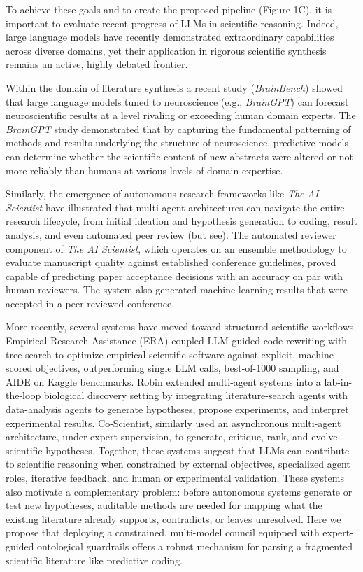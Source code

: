 \documentclass[12pt]{article}
\begin{document}
To achieve these goals and to create the proposed pipeline (Figure 1C), it is important to evaluate recent progress of LLMs in scientific reasoning. Indeed, large language models have recently demonstrated extraordinary capabilities across diverse domains, yet their application in rigorous scientific synthesis remains an active, highly debated frontier\cite{ref5,ref44,ref45,ref46}.

Within the domain of literature synthesis a recent study (\emph{BrainBench}) showed that large language models tuned to neuroscience (e.g., \emph{BrainGPT}) can forecast neuroscientific results at a level rivaling or exceeding human domain experts\cite{ref5}. The \emph{BrainGPT} study demonstrated that by capturing the fundamental patterning of methods and results underlying the structure of neuroscience, predictive models can determine whether the scientific content of new abstracts were altered or not more reliably than humans at various levels of domain expertise\cite{ref5}.

Similarly, the emergence of autonomous research frameworks like \emph{The AI Scientist}\cite{ref45} have illustrated that multi-agent architectures can navigate the entire research lifecycle, from initial ideation and hypothesis generation to coding, result analysis, and even automated peer review (but see\cite{ref47}). The automated reviewer component of \emph{The AI Scientist}, which operates on an ensemble methodology to evaluate manuscript quality against established conference guidelines, proved capable of predicting paper acceptance decisions with an accuracy on par with human reviewers. The system also generated machine learning results that were accepted in a peer-reviewed conference\cite{ref45}.

More recently, several systems have moved toward structured scientific workflows. Empirical Research Assistance (ERA)\cite{ref48} coupled LLM-guided code rewriting with tree search to optimize empirical scientific software against explicit, machine-scored objectives, outperforming single LLM calls, best-of-1000 sampling, and AIDE on Kaggle benchmarks. Robin\cite{ref86} extended multi-agent systems into a lab-in-the-loop biological discovery setting by integrating literature-search agents with data-analysis agents to generate hypotheses, propose experiments, and interpret experimental results. Co-Scientist\cite{ref87}, similarly used an asynchronous multi-agent architecture, under expert supervision, to generate, critique, rank, and evolve scientific hypotheses. Together, these systems suggest that LLMs can contribute to scientific reasoning when constrained by external objectives, specialized agent roles, iterative feedback, and human or experimental validation. These systems also motivate a complementary problem: before autonomous systems generate or test new hypotheses, auditable methods are needed for mapping what the existing literature already supports, contradicts, or leaves unresolved. Here we propose that deploying a constrained, multi-model council equipped with expert-guided ontological guardrails offers a robust mechanism for parsing a fragmented scientific literature like predictive coding.
\end{document}
